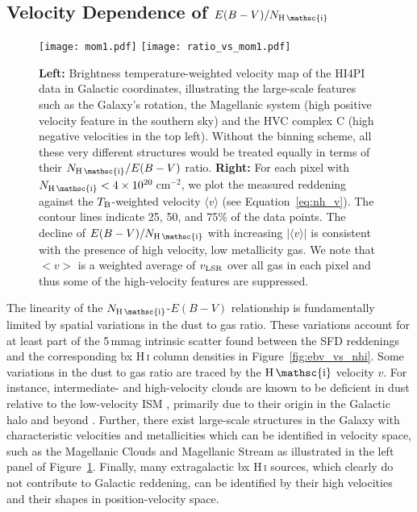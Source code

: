 \documentclass[iop,apj]{emulateapj}
\makeatletter
\def\testbx{bx}%
\DeclareRobustCommand{\ion}[2]{%
\relax\ifmmode
\ifx\testbx\f@series
{\mathbf{#1\,\mathsc{#2}}}\else
{\mathrm{#1\,\mathsc{#2}}}\fi
\else\textup{#1\,{\mdseries\textsc{#2}}}%
\fi}
\makeatother
\begin{document}
\subsection{Velocity Dependence of $E(B-V)/N_{\ion{H}{i}}$}
\begin{figure*}[tp]
    \texttt{[image: mom1.pdf]}
	\texttt{[image: ratio\_vs\_mom1.pdf]}
	\caption{\textbf{Left:} Brightness temperature-weighted velocity map of the HI4PI data in Galactic coordinates, illustrating the large-scale features such as the Galaxy's rotation, the Magellanic system (high positive velocity feature in the southern sky) and the HVC complex C (high negative velocities in the top left). Without the binning scheme, all these very different structures would be treated equally in terms of their $N_{\ion{H}{i}}/E(B-V)$ ratio. \textbf{Right:} For each pixel with $N_\ion{H}{i} < 4\times10^{20}$\,cm$^{-2}$, we plot the measured reddening against the $T_{\rm B}$-weighted velocity $\langle v \rangle$ (see Equation~\ref{eq:nh_v}). The contour lines indicate 25, 50, and 75\% of the data points. The decline of $E(B-V)/N_\ion{H}{i}$ with increasing $|\langle v \rangle|$ is consistent with the presence of high velocity, low metallicity gas. We note that $<v>$ is a weighted average of $v_{\rm LSR}$ over all gas in each pixel and thus some of the high-velocity features are suppressed.}
	\label{fig:ebv_vs_v}
\end{figure*}

The linearity of the $N_\ion{H}{i}$-$E(B-V)$ relationship is fundamentally limited by spatial variations in the dust to gas ratio. These variations account for at least part of the 5\,mmag intrinsic scatter found between the SFD reddenings and the corresponding \ion{H}{i} column densities in Figure~\ref{fig:ebv_vs_nhi}. Some variations in the dust to gas ratio are traced by the $\ion{H}{i}$ velocity $v$. For instance, intermediate- and high-velocity clouds \citep{Wakker+vanWoerden_1997} are known to be deficient in dust relative to the low-velocity ISM \citep{Boulanger+etal_1996, Reach+etal_1998, Planck_2011_XXIV}, primarily due to their origin in the Galactic halo and beyond \citep{Wakker+vanWoerden_1997, Putman+etal_2012, Fraternali+etal_2015}. Further, there exist large-scale structures in the Galaxy with characteristic velocities and metallicities which can be identified in velocity space, such as the Magellanic Clouds and Magellanic Stream \citep{Nidever+etal_2008} as illustrated in the left panel of Figure~\ref{fig:ebv_vs_v}. Finally, many extragalactic \ion{H}{i} sources, which clearly do not contribute to Galactic reddening, can be identified by their high velocities and their shapes in position-velocity space.
\end{document}
